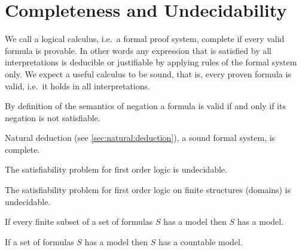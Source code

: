 

\chapter{Completeness and Undecidability}

	We call a logical calculus, i.e.~a formal proof system, {\myem complete} if every valid formula is provable.
	In other words any expression that is satisfied by all interpretations 
	is deducible or justifiable by applying rules of the formal system only.
	We expect a useful calculus to be {\myem sound}, that is, every proven formula is valid, 
	i.e.~it holds in all interpretations.

\begin{lemma}[Refutation]
	By definition of the semantics of negation a formula is valid if and only if its negation is not satisfiable.
\end{lemma}

\begin{theorem}
	Natural deduction (see \vref{sec:natural:deduction}), a sound formal system, is complete.
\end{theorem}

\begin{theorem}
	The satisfiability problem for first order logic is undecidable.
\end{theorem}

\begin{theorem}
	The satisfiability problem for first order logic on {\myem finite} structures (domains) is undecidable.
\end{theorem}

\begin{theorem}
\end{theorem}








\begin{theorem}[Compactness]\label{the:compactness}
	If every finite subset of a set of formulas $S$ has a model then $S$ has a model. 
\end{theorem}

\begin{theorem}\label{the:loewenheim}
	If a set of formulas $S$ has a model then $S$ has a countable model.
\end{theorem}


